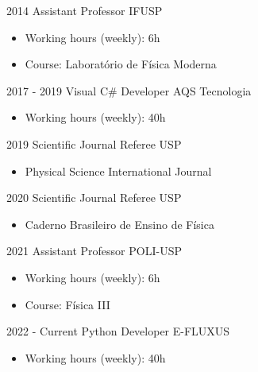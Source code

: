 \documentclass[9pt]{developercv} %
\begin{document}

\vspace{-10 pt}
\begin{entrylist}
	\entry
        {2014}
		{Assistant Professor}
		{IFUSP}
		{\vspace{-10pt}
        \begin{itemize}[noitemsep,topsep=0pt,parsep=0pt,partopsep=0pt, leftmargin=-1pt]
            \item Working hours (weekly): 6h
            \item Course: Laboratório de Física Moderna
        \end{itemize}
		}
	\entry
        {2017 - 2019}
		{Visual C\# Developer}
		{AQS Tecnologia}
		{\vspace{-10pt}
        \begin{itemize}[noitemsep,topsep=0pt,parsep=0pt,partopsep=0pt, leftmargin=-1pt]
            \item Working hours (weekly): 40h
        \end{itemize}
		}
	\entry
        {2019}
		{Scientific Journal Referee}
		{USP}
		{\vspace{-10pt}
        \begin{itemize}[noitemsep,topsep=0pt,parsep=0pt,partopsep=0pt, leftmargin=-1pt]
            \item Physical Science International Journal
        \end{itemize}
		}
	\entry
        {2020}
		{Scientific Journal Referee}
		{USP}
		{\vspace{-10pt}
        \begin{itemize}[noitemsep,topsep=0pt,parsep=0pt,partopsep=0pt, leftmargin=-1pt]
            \item Caderno Brasileiro de Ensino de Física
        \end{itemize}
		}
	\entry
        {2021}
		{Assistant Professor}
		{POLI-USP}
		{\vspace{-10pt}
        \begin{itemize}[noitemsep,topsep=0pt,parsep=0pt,partopsep=0pt, leftmargin=-1pt]
            \item Working hours (weekly): 6h
            \item Course: Física III
        \end{itemize}
		}
	\entry
        {2022 - Current}
		{Python Developer}
		{E-FLUXUS}
		{\vspace{-10pt}
        \begin{itemize}[noitemsep,topsep=0pt,parsep=0pt,partopsep=0pt, leftmargin=-1pt]
            \item Working hours (weekly): 40h
        \end{itemize}
		}
\end{entrylist}
\end{document}

